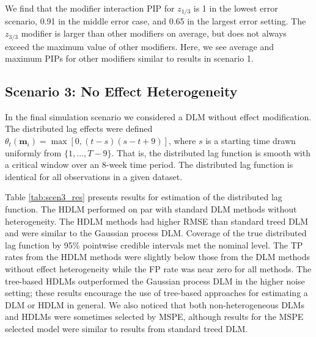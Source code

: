 \documentclass[12pt]{article}
\begin{document}
We find that the modifier interaction PIP for $z_{1/3}$ is 1 in the lowest error scenario, 0.91 in the middle error case, and 0.65 in the largest error setting. The $z_{3/3}$ modifier is larger than other modifiers on average, but does not always exceed the maximum value of other modifiers. Here, we see average and maximum PIPs for other modifiers similar to results in scenario 1.



\subsection{Scenario 3: No Effect Heterogeneity}
In the final simulation scenario we considered a DLM without effect modification. The distributed lag effects were defined $\theta_t(\mathbf{m}_i)=\max[0,(t-s)(s-t+9)]$, where $s$ is a starting time drawn uniformly from $\{1,\ldots,T-9\}$. That is, the distributed lag function is smooth with a critical window over an 8-week time period. The distributed lag function is identical for all observations in a given dataset.

Table \ref{tab:scen3_res} presents results for estimation of the distributed lag function. The HDLM performed on par with standard DLM methods without heterogeneity. The HDLM methods had higher RMSE than standard treed DLM and were similar to the Gaussian process DLM. Coverage of the true distributed lag function by 95\% pointwise credible intervals met the nominal level. The TP rates from the HDLM methods were slightly below those from the DLM methods without effect heterogeneity while the FP rate was near zero for all methods. The tree-based HDLMs outperformed the Gaussian process DLM in the higher noise setting; these results encourage the use of tree-based approaches for estimating a DLM or HDLM in general. We also noticed that both non-heterogeneous DLMs and HDLMs were sometimes selected by MSPE, although results for the MSPE selected model were similar to results from standard treed DLM.
\end{document}
